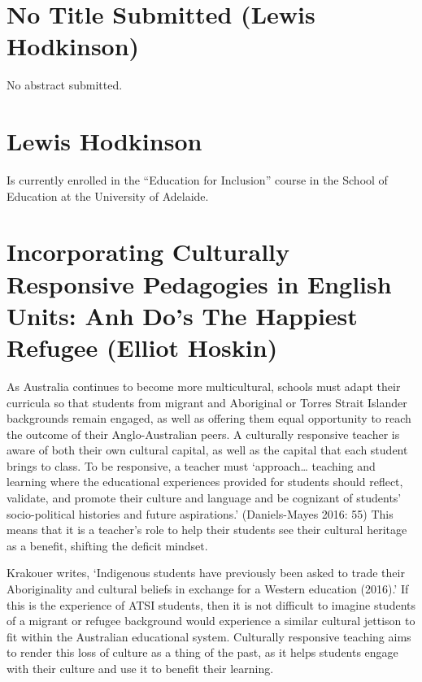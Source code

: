 \documentclass[twoside,12pt,a4paper,notitlepage]{memoir}
\begin{document}
\pagebreak
\section*{No Title Submitted (Lewis Hodkinson)}
\label{aut:hodkinson}

No abstract submitted.

\section*{Lewis Hodkinson}

Is currently enrolled in the ``Education for Inclusion'' course in the School of Education at the University of Adelaide.



\pagebreak
\section*{Incorporating Culturally Responsive Pedagogies in English Units: Anh Do's The Happiest Refugee (Elliot Hoskin)}
\label{aut:hoskin}

As Australia continues to become more multicultural, schools must adapt their curricula so that students from migrant and Aboriginal or Torres Strait Islander backgrounds remain engaged, as well as offering them equal opportunity to reach the outcome of their Anglo-Australian peers. A culturally responsive teacher is aware of both their own cultural capital, as well as the capital that each student brings to class. To be responsive, a teacher must ‘approach… teaching and learning where the educational experiences provided for students should reflect, validate, and promote their culture and language and be cognizant of students’ socio-political histories and future aspirations.’ (Daniels-Mayes 2016: 55) This means that it is a teacher’s role to help their students see their cultural heritage as a benefit, shifting the deficit mindset.


 Krakouer writes, ‘Indigenous students have previously been asked to trade their Aboriginality and cultural beliefs in exchange for a Western education (2016).’ If this is the experience of ATSI students, then it is not difficult to imagine students of a migrant or refugee background would experience a similar cultural jettison to fit within the 
Australian educational system. Culturally responsive teaching aims to render this loss of culture as a thing of the past, as it helps students engage with their culture and use it to benefit their learning.
\end{document}
